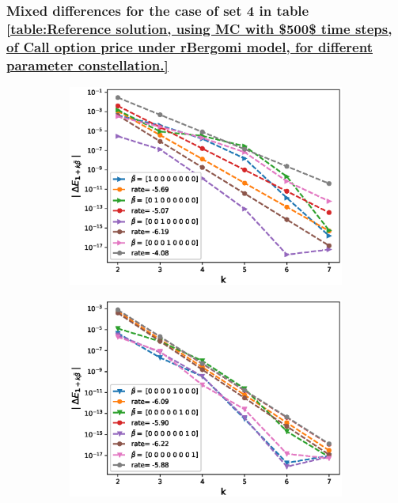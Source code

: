\documentclass[11pt]{article}
\begin{document}
\subsubsection{Mixed differences for the case of set 4 in table \ref{table:Reference solution, using MC with $500$ time steps, of Call option price under rBergomi model, for different parameter constellation.}}\label{Mixed differences for the case of set 4}
\begin{figure}[h!]
	\centering
	\begin{subfigure}{.4\textwidth}
		\centering
		\includegraphics[width=1\linewidth]{./figures/rBergomi_mixed_error_rates/without_change_measure/N_4/H_007/first_difference_rbergomi_4steps_H_007_K_12_totally_hierarch_with_rate_W1}
		\caption{}
		\label{fig:sub3}
	\end{subfigure}%
	\begin{subfigure}{.4\textwidth}
		\centering
		\includegraphics[width=1\linewidth]{./figures/rBergomi_mixed_error_rates/without_change_measure/N_4/H_007/first_difference_rbergomi_4steps_H_007_K_12_totally_hierarch_with_rate_W2}
		\caption{}
		\label{fig:sub4}
	\end{subfigure}
	

\end{figure}
\end{document}
